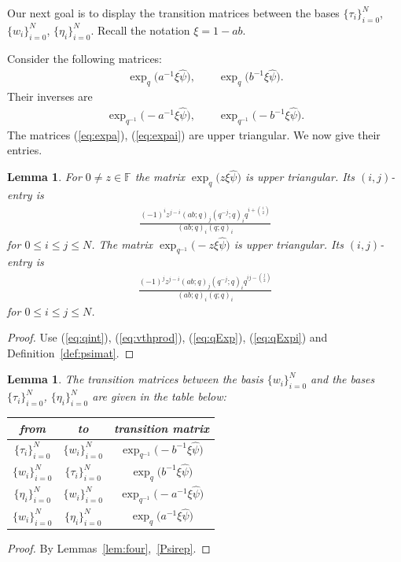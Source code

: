 \documentclass[pdftex]{sigma}
\numberwithin{equation}{section}
\newtheorem{Lemma}[Theorem]{Lemma}
\begin{document}
Our next goal is to display the transition matrices
between the bases
$\lbrace \tau_i\rbrace_{i=0}^N$,
$\lbrace w_i\rbrace_{i=0}^N$,
 $\lbrace \eta_i\rbrace_{i=0}^N$.
Recall the notation $\xi = 1-ab$.

Consider the following matrices:
\begin{gather}
\exp_q \big( a^{-1} \xi \widehat \psi \big),
\qquad
\exp_q \big( b^{-1} \xi \widehat \psi \big).
\label{eq:expa}
\end{gather}
Their inverses are
\begin{gather}
\exp_{q^{-1}} \big({-}a^{-1} \xi \widehat \psi \big),
\qquad
\exp_{q^{-1}} \big({-}b^{-1} \xi \widehat \psi \big).
\label{eq:expai}
\end{gather}
The matrices (\ref{eq:expa}), (\ref{eq:expai}) are upper triangular. We now give their
entries.

\begin{Lemma}\label{lem:expEntries}
For $0 \not= z \in \mathbb F$ the matrix
$\exp_q \big( z \xi \widehat \psi \big)$ is upper
triangular. Its $(i,j)$-entry is
\begin{gather*}
\frac{(-1)^i z^{j-i}
(ab;q)_j
(q^{-j};q)_i
q^{i+\binom{i}{2}}}
{(ab;q)_i (q;q)_i}
\end{gather*}
for $0 \leq i \leq j \leq N$.
The matrix
$\exp_{q^{-1}} \big( {-}z \xi \widehat \psi \big)$ is upper
triangular. Its $(i,j)$-entry is
\begin{gather*}
\frac{(-1)^j z^{j-i}
(ab;q)_j
(q^{-j};q)_i
q^{ij-\binom{j}{2}}}
{(ab;q)_i (q;q)_i}
\end{gather*}
for $0 \leq i \leq j \leq N$.
\end{Lemma}
\begin{proof}
Use
(\ref{eq:qint}),
(\ref{eq:vthprod}),
(\ref{eq:qExp}),
(\ref{eq:qExpi}) and Definition~\ref{def:psimat}.
\end{proof}

\begin{Lemma}\label{lem:4trans}
The transition matrices between the basis
$\lbrace w_i \rbrace_{i=0}^N$ and the bases
$\lbrace \tau_i \rbrace_{i=0}^N$,
$\lbrace \eta_i \rbrace_{i=0}^N$ are given in the table below:
\begin{center}
\begin{tabular}[t]{ccc}
 {\rm from} & {\rm to}
 &{\rm transition matrix}
\\
\hline
$\lbrace \tau_i\rbrace_{i=0}^N$ &
$\lbrace w_i\rbrace_{i=0}^N$
&$\exp_{q^{-1}} \big({-}b^{-1} \xi \widehat \psi \big)$
\\
$\lbrace w_i\rbrace_{i=0}^N$ &
$\lbrace \tau_i\rbrace_{i=0}^N$
&$\exp_{q} \big(b^{-1} \xi \widehat \psi \big)$
\\
$\lbrace \eta_i\rbrace_{i=0}^N$ &
$\lbrace w_i\rbrace_{i=0}^N$
&$\exp_{q^{-1}} \big(-a^{-1} \xi \widehat \psi \big)$
\\
$\lbrace w_i\rbrace_{i=0}^N$ &
$\lbrace \eta_i\rbrace_{i=0}^N$
&
$\exp_{q} \big(a^{-1} \xi \widehat \psi \big)$
\\
\end{tabular}
\end{center}
\end{Lemma}
\begin{proof} By Lemmas~\ref{lem:four},~\ref{Psirep}.
\end{proof}
\end{document}
